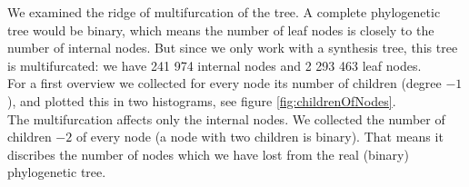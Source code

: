     We examined the ridge of multifurcation of the tree. A complete phylogenetic tree would be 
      binary, which means the number of leaf nodes is closely to the number of internal nodes. But 
      since we only work with a synthesis tree, this tree is multifurcated: we have 241 974 internal 
      nodes and 2 293 463 leaf nodes. \\
    For a first overview we collected for every node its number of children (degree $-1$), and plotted
      this in two histograms, see figure \ref{fig:childrenOfNodes}. \\
    The multifurcation affects only the internal nodes. We collected the number of children $-2$ of 
      every node (a node with two children is binary). That means it discribes the number of nodes which we have lost from the real (binary) 
    phylogenetic tree. \\
